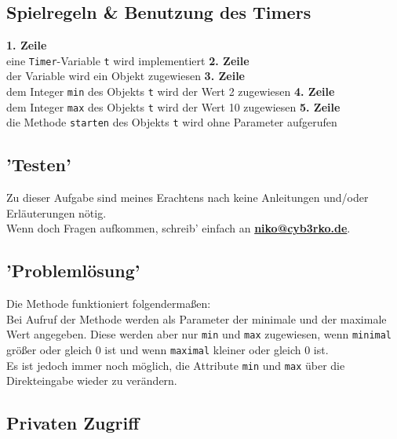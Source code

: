 \documentclass{scrartcl}   %
\begin{document}
\subsection{Spielregeln \& Benutzung des Timers}

\begin{itemize}
    \barrow \textbf{1. Zeile}\\
    eine \texttt{Timer}-Variable \texttt{t} wird implementiert
    \barrow \textbf{2. Zeile}\\
    der Variable wird ein Objekt zugewiesen
    \barrow \textbf{3. Zeile}\\
    dem Integer \texttt{min} des Objekts \texttt{t} wird der Wert 2 zugewiesen
    \barrow \textbf{4. Zeile}\\
    dem Integer \texttt{max} des Objekts \texttt{t} wird der Wert 10 zugewiesen
    \barrow \textbf{5. Zeile}\\
    die Methode \texttt{starten} des Objekts \texttt{t} wird ohne Parameter aufgerufen
\end{itemize}

\subsection{'Testen'}

Zu dieser Aufgabe sind meines Erachtens nach keine Anleitungen und/oder Erläuterungen nötig.\\
Wenn doch Fragen aufkommen, schreib' einfach an \textbf{\href{mailto:niko@cyb3rko.de}{niko@cyb3rko.de}}.

\subsection{'Problemlösung'}

Die Methode funktioniert folgendermaßen:\\
Bei Aufruf der Methode werden als Parameter der minimale und der maximale Wert angegeben. Diese werden aber nur \texttt{min} und \texttt{max} zugewiesen, wenn \texttt{minimal} größer oder gleich 0 ist und wenn \texttt{maximal} kleiner oder gleich 0 ist.\\
Es ist jedoch immer noch möglich, die Attribute \texttt{min} und \texttt{max} über die Direkteingabe wieder zu verändern.

\newpage

\subsection{Privaten Zugriff}
\end{document}
